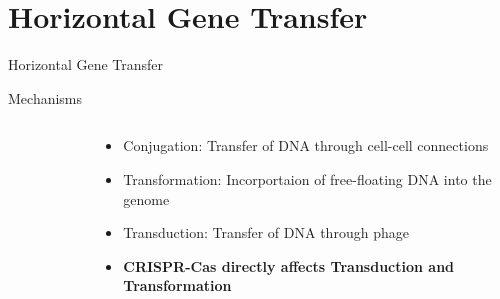 \documentclass[dvipsnames]{beamer}
\begin{document}
\section{Horizontal Gene Transfer}
\begin{frame}{}
    \begin{center}
        \Huge \textcolor{OliveGreen}{Horizontal Gene Transfer}
    \end{center}
\end{frame}
\begin{frame}[fragile]{Mechanisms}
    \begin{columns}
    \begin{column}{0.5\textwidth}
        \begin{figure}[htb!]
            \autocite{trendslgt}
        \end{figure}
    \end{column}
    \begin{column}{0.5\textwidth}
        \begin{itemize}
            \item<2-> Conjugation: Transfer of DNA through cell-cell connections\autocite{trendslgt}
            \item<3-> Transformation: Incorportaion of free-floating DNA into the genome\autocite{trendslgt}
            \item<4-> Transduction: Transfer of DNA through phage\autocite{trendslgt}
            \item<5-> \textbf{CRISPR-Cas directly affects Transduction and Transformation}\autocite{trendslgt}
        \end{itemize}
    \end{column}
    \end{columns}
\end{frame}
\end{document}
